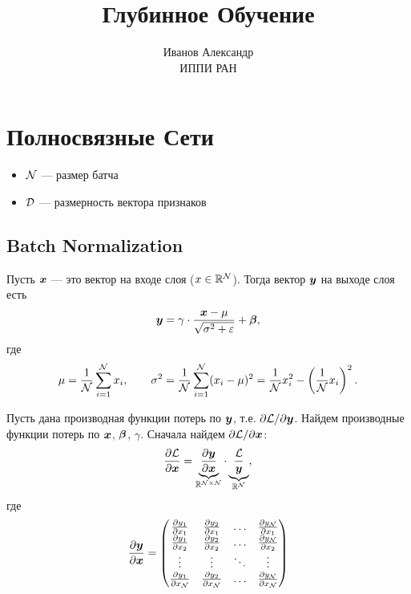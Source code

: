\documentclass{report}
\numberwithin{theorem}{chapter}
\numberwithin{statement}{chapter}
\numberwithin{lemma}{chapter}
\theoremstyle{definition}
\numberwithin{task}{chapter}
\theoremstyle{remark}
\numberwithin{example}{chapter}
\theoremstyle{definition}
\numberwithin{definition}{chapter}
\theoremstyle{remark}
\theoremstyle{remark}
\numberwithin{lyrics}{section}
\begin{document}
\title{Глубинное Обучение}
\author{Иванов Александр \\ ИППИ РАН}
\date{}
\maketitle
\tableofcontents
	


\chapter{Полносвязные Сети}

\begin{itemize}
	\item $\mathcal{N}$ --- размер батча
	\item $\mathcal{D}$ --- размерность вектора признаков
\end{itemize}

\section{Batch Normalization}

Пусть $\boldsymbol{x}$ --- это вектор на входе слоя ($x \in \mathbb{R}^{\mathcal{N}}$). Тогда вектор $\boldsymbol{y}$ на выходе слоя есть
$$
\boldsymbol{y} = \gamma \cdot \frac{\boldsymbol{x} - \mu}{\sqrt{\sigma^2 + \varepsilon}} + \boldsymbol{\beta},
$$
где $$\mu = \frac{1}{\mathcal{N}}\sum\limits_{i=1}^{\mathcal{N}} x_i, \qquad \sigma^2 = \frac{1}{\mathcal{N}}\sum\limits_{i = 1}^{\mathcal{N}} (x_i - \mu)^2 = \frac{1}{\mathcal{N}} x_i^2 - \left(\frac{1}{\mathcal{N}} x_i \right)^2.$$

Пусть дана производная функции потерь по $\boldsymbol{y}$, т.е. $\partial \mathcal{L} / \partial \boldsymbol{y}$. Найдем производные функции потерь по $\boldsymbol{x}$, $\boldsymbol{\beta}$, $\gamma$.
Сначала найдем $\partial \mathcal{L} / \partial \boldsymbol{x}$:
\begin{gather}
\frac{\partial \mathcal{L} }{\partial \boldsymbol{x}} = \underbrace{\frac{\partial \boldsymbol{y} }{\partial \boldsymbol{x}}}_{\mathbb{R}^{\mathcal{N} \times \mathcal{N}}} \cdot \underbrace{\frac{\mathcal{L}}{\boldsymbol{y}}}_{\mathbb{R}^{\mathcal{N}}},
\end{gather}
где 
\begin{equation}
\frac{\partial \boldsymbol{y} }{\partial \boldsymbol{x}} = 
\begin{pmatrix}
\frac{\partial y_1 }{\partial x_1} &\frac{\partial y_2 }{\partial x_1} &\dots &\frac{\partial y_{\mathcal{N}} }{\partial x_1} \\
\frac{\partial y_1 }{\partial x_2} &\frac{\partial y_2 }{\partial x_2} &\dots &\frac{\partial y_{\mathcal{N}} }{\partial x_2} \\
\vdots 			   &\vdots 			   &\ddots &\vdots                        \\
\frac{\partial y_1 }{\partial x_{\mathcal{N}}} &\frac{\partial y_2 }{\partial x_{\mathcal{N}}} &\dots &\frac{\partial y_{\mathcal{N}} }{\partial x_{\mathcal{N}}} \\
\end{pmatrix}
\end{equation}
\end{document}
